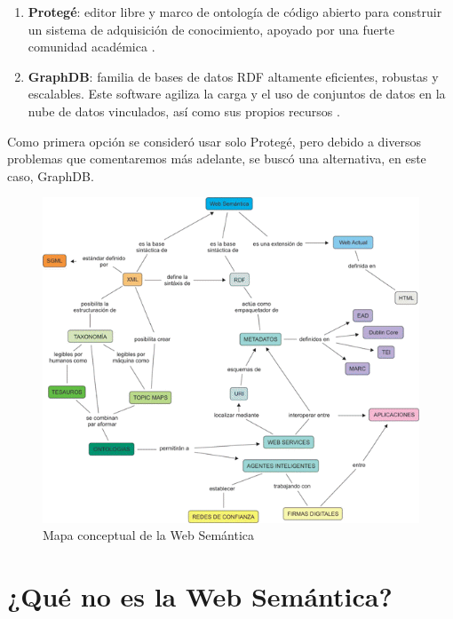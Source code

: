\begin{enumerate}
	\item \textbf{Protegé}: editor libre y marco de ontología de código abierto para construir un sistema de adquisición de conocimiento, apoyado por una fuerte comunidad académica \cite{protege}. 
	
	\item \textbf{GraphDB}: familia de bases de datos RDF altamente eficientes, robustas y escalables. Este software agiliza la carga y el uso de conjuntos de datos en la nube de datos vinculados, así como sus propios recursos \cite{graphdb}.
\end{enumerate}

 Como primera opción se consideró usar solo Protegé, pero debido a diversos problemas que comentaremos más adelante, se buscó una alternativa, en este caso, GraphDB.  


\begin{figure}[H]
	\centering
	\includegraphics[width=1\linewidth]{imagenes/capitulo3/mapawebsemantica-3}
	\caption{Mapa conceptual de la Web Semántica \cite{imagen-final-esquema-ws}}
	\label{fig:mapawebsemantica-3}
\end{figure}




\section{¿Qué no es la Web Semántica?}

